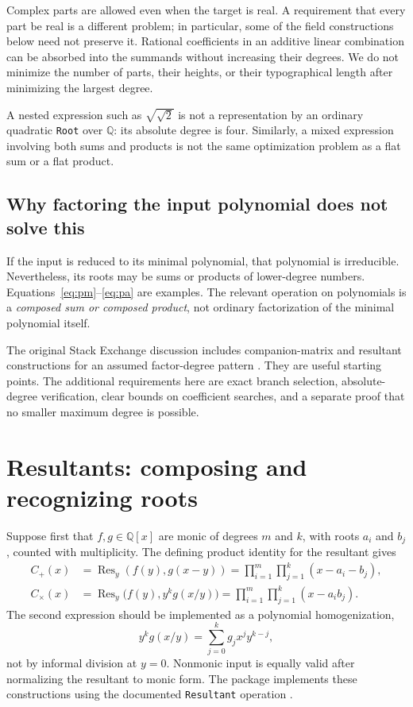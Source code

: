 \documentclass[11pt,a4paper]{article}
\theoremstyle{definition}\newtheorem{definition}[theorem]{Definition}
\theoremstyle{remark}\newtheorem{remark}[theorem]{Remark}
\newcommand{\Q}{\mathbb{Q}}\newcommand{\C}{\mathbb{C}}
\newcommand{\Res}{\operatorname{Res}}
\newcommand{\code}[1]{\texttt{#1}}
\begin{document}
Complex parts are allowed even when the target is real. A requirement that every part be real is a different problem; in particular, some of the field constructions below need not preserve it. Rational coefficients in an additive linear combination can be absorbed into the summands without increasing their degrees. We do not minimize the number of parts, their heights, or their typographical length after minimizing the largest degree.

A nested expression such as $\sqrt{\sqrt{2}}$ is not a representation by an ordinary quadratic \code{Root} over $\Q$: its absolute degree is four. Similarly, a mixed expression involving both sums and products is not the same optimization problem as a flat sum or a flat product.

\subsection{Why factoring the input polynomial does not solve this}
If the input is reduced to its minimal polynomial, that polynomial is irreducible. Nevertheless, its roots may be sums or products of lower-degree numbers. Equations~\eqref{eq:pm}--\eqref{eq:pa} are examples. The relevant operation on polynomials is a \emph{composed sum or composed product}, not ordinary factorization of the minimal polynomial itself.

The original Stack Exchange discussion includes companion-matrix and resultant constructions for an assumed factor-degree pattern \cite{question}. They are useful starting points. The additional requirements here are exact branch selection, absolute-degree verification, clear bounds on coefficient searches, and a separate proof that no smaller maximum degree is possible.

\section{Resultants: composing and recognizing roots}
\label{sec:resultants}
Suppose first that $f,g\in\Q[x]$ are monic of degrees $m$ and $k$, with roots $a_i$ and $b_j$, counted with multiplicity. The defining product identity for the resultant gives
\begin{align}
C_+(x)&=\Res_y(f(y),g(x-y))
       =\prod_{i=1}^m\prod_{j=1}^k(x-a_i-b_j),\label{eq:sumres}\\
C_{\times}(x)&=\Res_y\bigl(f(y),y^k g(x/y)\bigr)
       =\prod_{i=1}^m\prod_{j=1}^k(x-a_i b_j).\label{eq:prodres}
\end{align}
The second expression should be implemented as a polynomial homogenization,
\[
y^k g(x/y)=\sum_{j=0}^k g_j x^j y^{k-j},
\]
not by informal division at $y=0$. Nonmonic input is equally valid after normalizing the resultant to monic form. The package implements these constructions using the documented \code{Resultant} operation \cite{resultant}.
\end{document}

